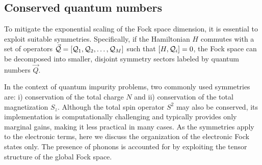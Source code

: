 \documentclass[edipack_sp.tex]{subfiles}
\begin{document}















\subsection{Conserved quantum numbers}\label{sSecQNs}
To mitigate the exponential scaling of the Fock space dimension, it 
is essential to exploit suitable symmetries. Specifically, if the 
Hamiltonian $H$ commutes with a set of operators ${\cal \vec{Q}}=[{\cal Q}_1,{\cal Q}_2,\dots,{\cal Q}_M]$ such that 
$[H, {\cal Q}_i] = 0$, the Fock space can be decomposed into smaller, 
disjoint symmetry sectors labeled by quantum numbers $\vec{Q}$.

In the context of quantum impurity problems, two commonly used 
symmetries are: i) conservation of the total charge $N$ and ii) 
conservation of the total magnetization $S_z$. Although the total 
spin operator $S^2$ may also be conserved, its implementation is 
computationally challenging and typically provides only marginal 
gains, making it less practical in many cases.
As the symmetries apply to the electronic terms, here we discuss the organization of the electronic Fock states only. The presence of phonons is accounted for by exploiting the tensor structure of the global Fock space.  
\end{document}
